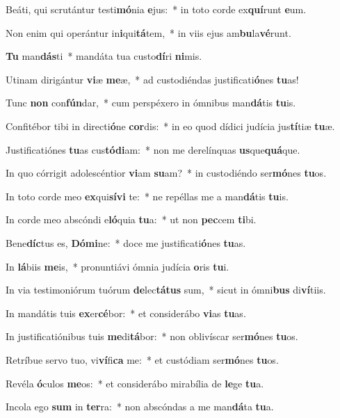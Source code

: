 \item Beáti, qui scrutántur testi\textbf{mó}nia \textbf{e}jus:~* in toto corde ex\textbf{quí}runt \textbf{e}um.
\item Non enim qui operántur in\textbf{i}qui\textbf{tá}tem,~* in viis ejus am\textbf{bu}la\textbf{vé}runt.
\item \textbf{Tu} man\textbf{dás}ti~* mandáta tua custo\textbf{dí}ri \textbf{ni}mis.
\item Utinam dirigántur \textbf{vi}æ \textbf{me}æ,~* ad custodiéndas justificati\textbf{ó}nes \textbf{tu}as!
\item Tunc \textbf{non} con\textbf{fún}dar,~* cum perspéxero in ómnibus man\textbf{dá}tis \textbf{tu}is.
\item Confitébor tibi in directi\textbf{ó}ne \textbf{cor}dis:~* in eo quod dídici judícia jus\textbf{tí}tiæ \textbf{tu}æ.
\item Justificatiónes \textbf{tu}as cus\textbf{tó}\textbf{di}am:~* non me derelínquas \textbf{us}que\textbf{quá}que.
\item In quo córrigit adolescéntior \textbf{vi}am \textbf{su}am?~* in custodiéndo ser\textbf{mó}nes \textbf{tu}os.
\item In toto corde meo \textbf{ex}qui\textbf{sí}\textbf{vi} te:~* ne repéllas me a man\textbf{dá}tis \textbf{tu}is.
\item In corde meo abscóndi e\textbf{ló}quia \textbf{tu}a:~* ut non \textbf{pec}cem \textbf{ti}bi.
\item Bene\textbf{díc}tus es, \textbf{Dó}\textbf{mi}ne:~* doce me justificati\textbf{ó}nes \textbf{tu}as.
\item In \textbf{lá}biis \textbf{me}is,~* pronuntiávi ómnia judícia \textbf{o}ris \textbf{tu}i.
\item In via testimoniórum tuórum \textbf{de}lec\textbf{tá}\textbf{tus} sum,~* sicut in ómni\textbf{bus} di\textbf{ví}tiis.
\item In mandátis tuis \textbf{ex}er\textbf{cé}bor:~* et considerábo \textbf{vi}as \textbf{tu}as.
\item In justificatiónibus tuis \textbf{me}di\textbf{tá}bor:~* non oblivíscar ser\textbf{mó}nes \textbf{tu}os.
\item Retríbue servo tuo, vi\textbf{ví}fi\textbf{ca} me:~* et custódiam ser\textbf{mó}nes \textbf{tu}os.
\item Revéla \textbf{ó}culos \textbf{me}os:~* et considerábo mirabília de \textbf{le}ge \textbf{tu}a.
\item Incola ego \textbf{sum} in \textbf{ter}ra:~* non abscóndas a me man\textbf{dá}ta \textbf{tu}a.
